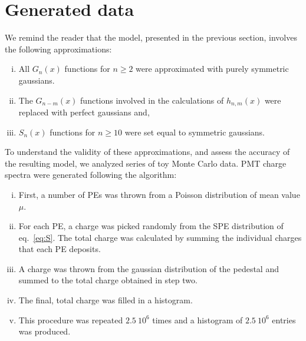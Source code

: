 \documentclass[preprint,12pt]{elsarticle}
\begin{document}
\section{Generated data}
\label{sec:sim}

We remind the reader that the model, presented in the previous section, involves the following approximations:
\begin{enumerate}[i.]
\item All $G_n(x)$ functions for $n \geq 2$ were approximated with purely symmetric gaussians.
\item The $G_{n-m}(x)$ functions involved in the calculations of $h_{n,m}(x)$ were replaced with perfect gaussians and,  
\item $S_n(x)$ functions for $n\geq10$ were set equal to symmetric gaussians. 
\end{enumerate}
To understand the validity of these approximations, and assess the accuracy of the resulting model, we analyzed series of toy Monte Carlo data.  
PMT charge spectra were generated following the algorithm:
\begin{enumerate}[i.]
\item First, a number of PEs was thrown from a Poisson distribution of mean value $\mu$. 
\item For each PE, a charge was picked randomly from the SPE distribution of eq.~\eqref{eq:S}.
The total charge was calculated by summing the individual charges that each PE deposits.
\item A charge was thrown from the gaussian distribution of the pedestal and summed to the total charge obtained in step two.
\item The final, total charge was filled in a histogram.
\item This procedure was repeated $2.5\ 10^6$ times and a histogram of $2.5\ 10^6$ entries was produced.
\end{enumerate}
\end{document}
